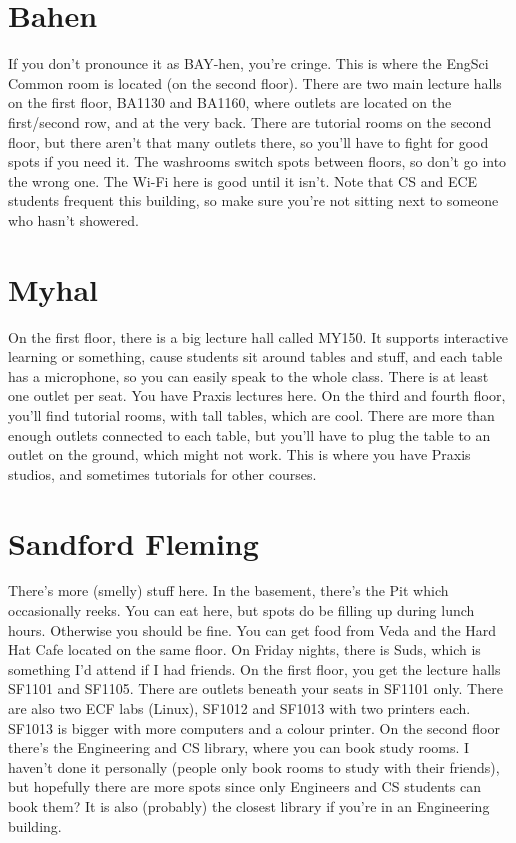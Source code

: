 \section{Bahen}

If you don't pronounce it as BAY-hen, you're cringe. This is where the EngSci Common room is located (on the second floor). There are two main lecture halls on the first floor, BA1130 and BA1160, where outlets are located on the first/second row, and at the very back. There are tutorial rooms on the second floor, but there aren't that many outlets there, so you'll have to fight for good spots if you need it. The washrooms switch spots between floors, so don't go into the wrong one. The Wi-Fi here is good until it isn't. Note that CS and ECE students frequent this building, so make sure you're not sitting next to someone who hasn't showered.

\section{Myhal}

On the first floor, there is a big lecture hall called MY150. It supports interactive learning or something, cause students sit around tables and stuff, and each table has a microphone, so you can easily speak to the whole class. There is at least one outlet per seat. You have Praxis lectures here. On the third and fourth floor, you'll find tutorial rooms, with tall tables, which are cool. There are more than enough outlets connected to each table, but you'll have to plug the table to an outlet on the ground, which might not work. This is where you have Praxis studios, and sometimes tutorials for other courses.

\section{Sandford Fleming}

There's more (smelly) stuff here. In the basement, there's the Pit which occasionally reeks. You can eat here, but spots do be filling up during lunch hours. Otherwise you should be fine. You can get food from Veda and the Hard Hat Cafe located on the same floor. On Friday nights, there is Suds, which is something I'd attend if I had friends. On the first floor, you get the lecture halls SF1101 and SF1105. There are outlets beneath your seats in SF1101 only. There are also two ECF labs (Linux), SF1012 and SF1013 with two printers each. SF1013 is bigger with more computers and a colour printer. On the second floor there's the Engineering and CS library, where you can book study rooms. I haven't done it personally (people only book rooms to study with their friends), but hopefully there are more spots since only Engineers and CS students can book them? It is also (probably) the closest library if you're in an Engineering building.


